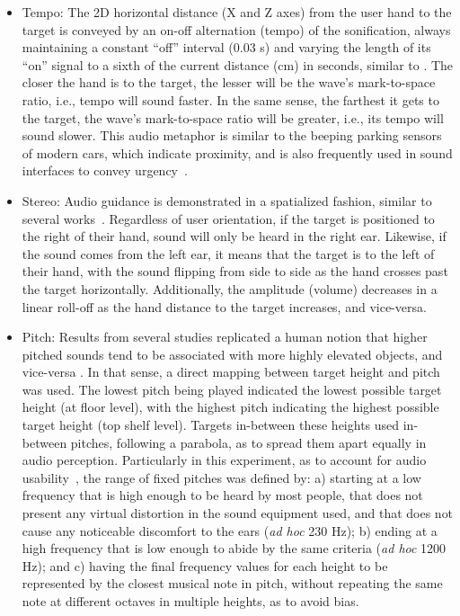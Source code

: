 \documentclass{vgtc}                          %
\begin{document}
\begin{itemize}
        \item Tempo: The 2D horizontal distance (X and Z axes) from the user hand to the target is conveyed by an on-off alternation (tempo) of the sonification, always maintaining a constant “off” interval (0.03 s) and varying the length of its “on” signal to a sixth of the current distance (cm) in seconds, similar to \cite{guarese:2022}. 
        The closer the hand is to the target, the lesser will be the wave’s mark-to-space ratio, i.e., tempo will sound faster. In the same sense, the farthest it gets to the target, the wave’s mark-to-space ratio will be greater, i.e., its tempo will sound slower. This audio metaphor is similar to the beeping parking sensors of modern cars, which indicate proximity, and is also frequently used in sound interfaces to convey urgency~\cite{edworthy:1995}. 
        \item Stereo: Audio guidance is demonstrated in a spatialized fashion, similar to several works~\cite{pare:2021, guarese:2021, barde:2020}. Regardless of user orientation, if the target is positioned to the right of their hand, sound will only be heard in the right ear. Likewise, if the sound comes from the left ear, it means that the target is to the left of their hand, with the sound flipping from side to side as the hand crosses past the target horizontally. Additionally, the amplitude (volume) decreases in a linear roll-off as the hand distance to the target increases, and vice-versa.  
        \item Pitch: Results from several studies replicated a human notion that higher pitched sounds tend to be associated with more highly elevated objects, and vice-versa \cite{Evans:2010, Neuhoff:2002}. In that sense, a direct mapping between target height and pitch was used. The lowest pitch being played indicated the lowest possible target height (at floor level), with the highest pitch indicating the highest possible target height (top shelf level). Targets in-between these heights used in-between pitches, following a parabola, as to spread them apart equally in audio perception. Particularly in this experiment, as to account for audio usability~\cite{buzzScale}, the range of fixed pitches was defined by: a) starting at a low frequency that is high enough to be heard by most people, that does not present any virtual distortion in the sound equipment used, and that does not cause any noticeable discomfort to the ears (\textit{ad hoc} 230 Hz); b) ending at a high frequency that is low enough to abide by the same criteria (\textit{ad hoc} 1200 Hz); and c) having the final frequency values for each height to be represented by the closest musical note in pitch, without repeating the same note at different octaves in multiple heights, as to avoid bias. %
        

\end{itemize}
\end{document}
